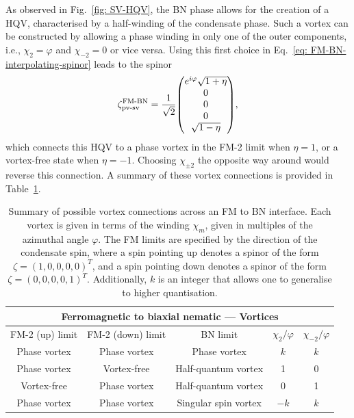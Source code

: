 As observed in Fig.~\ref{fig: SV-HQV}, the BN phase allows for the creation
of a HQV, characterised by a half-winding of the condensate phase.
Such a vortex can be constructed by allowing a phase winding in only one of the
outer components, i.e., \(\chi_2 = \varphi \) and \(\chi_{-2} = 0\) or vice
versa.
Using this first choice in Eq.~\eqref{eq: FM-BN-interpolating-spinor} leads to
the spinor
\begin{align}\label{eq: FM-BN-pv-hqv}
    \zeta^\text{FM-BN}_\text{pv-sv} = \frac{1}{\sqrt{2}}\mqty(
    e^{i\varphi} \sqrt{1 + \eta} \\
    0 \\
    0 \\
    0 \\
    \sqrt{1 - \eta}),
\end{align}
which connects this HQV to a phase vortex in the FM-2 limit when \(\eta = 1\),
or a vortex-free state when \(\eta = -1\).
Choosing \(\chi_{\pm 2}\) the opposite way around would reverse this connection.
A summary of these vortex connections is provided in
Table~\ref{tab: FM-BN-vortices}.
\begin{table}
    \centering
    \begin{tabular}{ccccc}
        \toprule
        \multicolumn{5}{c}{Ferromagnetic to biaxial nematic --- Vortices} \\
        \midrule
        FM-2 (up) limit & FM-2 (down) limit & BN limit &  \(\chi_2/\varphi \)
        & \(\chi_{-2}/\varphi \)  \\
        \midrule
         Phase vortex & Phase vortex & Phase vortex & \(k\) & \(k\) \\ 
         Phase vortex & Vortex-free & Half-quantum vortex & 1 & 0 \\
         Vortex-free & Phase vortex & Half-quantum vortex & 0 & 1 \\
         Phase vortex & Phase vortex & Singular spin vortex  & \(-k\) & \(k\) \\
        \bottomrule
    \end{tabular}
    \caption[Examples of possible vortex connections across a ferromagnetic
    to biaxial nematic interface]{\label{tab: FM-BN-vortices}
    Summary of possible vortex connections across an FM to BN interface.
    Each vortex is given in terms of the winding \(\chi_m\), given in multiples
    of the azimuthal angle \(\varphi \).
    The FM limits are specified by the direction of the condensate spin, where
    a spin pointing up denotes a spinor of the form
    \(\zeta={(1, 0, 0, 0, 0)}^T\), and a spin pointing down denotes a spinor of
    the form \(\zeta={(0, 0, 0, 0, 1)}^T\).
    Additionally, \(k\) is an integer that allows one to generalise to higher
    quantisation.}
\end{table}

